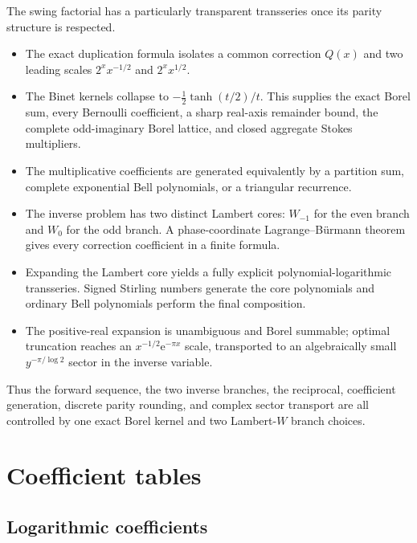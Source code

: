 \documentclass[11pt]{article}
\theoremstyle{definition}
\theoremstyle{remark}
\newcommand{\e}{\mathrm e}
\begin{document}
The swing factorial has a particularly transparent transseries once its parity structure is respected.

\begin{itemize}
\item The exact duplication formula isolates a common correction $Q(x)$ and two leading scales $2^xx^{-1/2}$ and $2^xx^{1/2}$.
\item The Binet kernels collapse to $-\frac12\tanh(t/2)/t$.  This supplies the exact Borel sum, every Bernoulli coefficient, a sharp real-axis remainder bound, the complete odd-imaginary Borel lattice, and closed aggregate Stokes multipliers.
\item The multiplicative coefficients are generated equivalently by a partition sum, complete exponential Bell polynomials, or a triangular recurrence.
\item The inverse problem has two distinct Lambert cores: $W_{-1}$ for the even branch and $W_0$ for the odd branch.  A phase-coordinate Lagrange--B\"urmann theorem gives every correction coefficient in a finite formula.
\item Expanding the Lambert core yields a fully explicit polynomial-logarithmic transseries.  Signed Stirling numbers generate the core polynomials and ordinary Bell polynomials perform the final composition.
\item The positive-real expansion is unambiguous and Borel summable; optimal truncation reaches an $x^{-1/2}\e^{-\pi x}$ scale, transported to an algebraically small $y^{-\pi/\log2}$ sector in the inverse variable.
\end{itemize}

Thus the forward sequence, the two inverse branches, the reciprocal, coefficient generation, discrete parity rounding, and complex sector transport are all controlled by one exact Borel kernel and two Lambert-$W$ branch choices.

\appendix

\section{Coefficient tables}\label{app:tables}

\subsection{Logarithmic coefficients}
\end{document}
